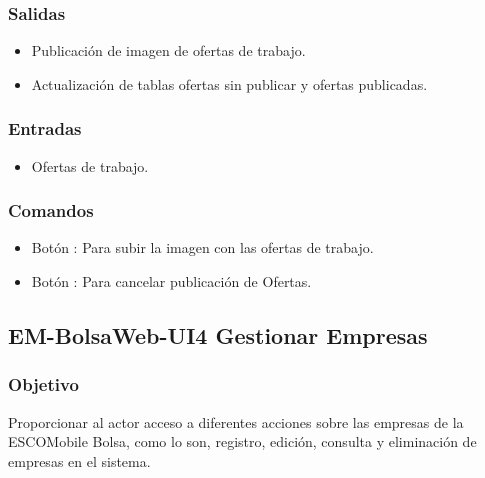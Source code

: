 

\subsubsection{Salidas}
	\begin{itemize}
	\item Publicación de imagen de ofertas de trabajo.
	\item Actualización de tablas ofertas sin publicar y ofertas publicadas.
	\end{itemize}
\subsubsection{Entradas}
	\begin{itemize}
	\item Ofertas de trabajo.
	\end{itemize}
\subsubsection{Comandos}
 	\begin{itemize}
		\item Botón : Para subir la imagen con las ofertas de trabajo.  
		\item Botón : Para cancelar publicación de Ofertas.

	\end{itemize}









					



\subsection{EM-BolsaWeb-UI4 Gestionar Empresas}

\subsubsection{Objetivo}
	\noindent
	Proporcionar al actor acceso a diferentes acciones sobre las empresas de la ESCOMobile Bolsa, como lo son, registro, edición, consulta y eliminación de empresas en el sistema. 


